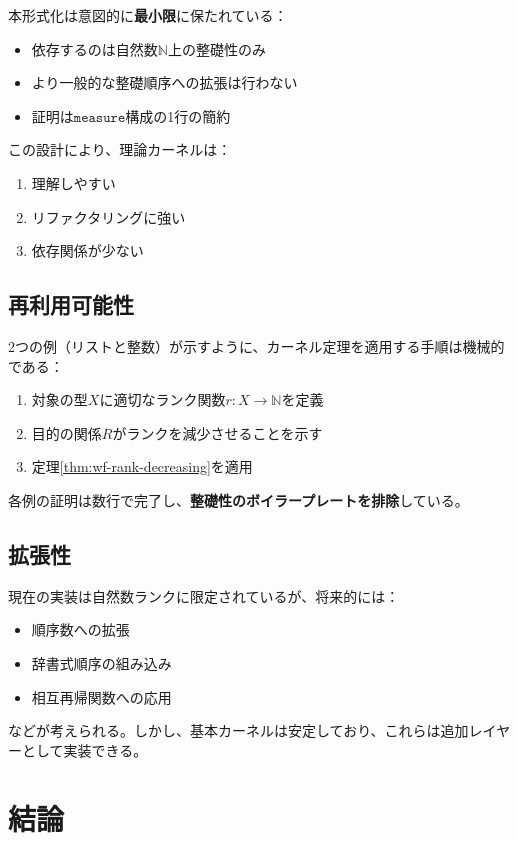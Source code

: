 \documentclass[11pt,a4paper]{ltjsarticle}
\theoremstyle{definition}
\begin{document}
本形式化は意図的に\textbf{最小限}に保たれている：
\begin{itemize}
\item 依存するのは自然数$\mathbb{N}$上の整礎性のみ
\item より一般的な整礎順序への拡張は行わない
\item 証明は$\texttt{measure}$構成の1行の簡約
\end{itemize}

この設計により、理論カーネルは：
\begin{enumerate}
\item 理解しやすい
\item リファクタリングに強い
\item 依存関係が少ない
\end{enumerate}

\subsection{再利用可能性}

2つの例（リストと整数）が示すように、カーネル定理を適用する手順は機械的である：
\begin{enumerate}
\item 対象の型$X$に適切なランク関数$r : X \to \mathbb{N}$を定義
\item 目的の関係$R$がランクを減少させることを示す
\item 定理\ref{thm:wf-rank-decreasing}を適用
\end{enumerate}

各例の証明は数行で完了し、\textbf{整礎性のボイラープレートを排除}している。

\subsection{拡張性}

現在の実装は自然数ランクに限定されているが、将来的には：
\begin{itemize}
\item 順序数への拡張
\item 辞書式順序の組み込み
\item 相互再帰関数への応用
\end{itemize}
などが考えられる。しかし、基本カーネルは安定しており、これらは追加レイヤーとして実装できる。

\section{結論}
\end{document}
